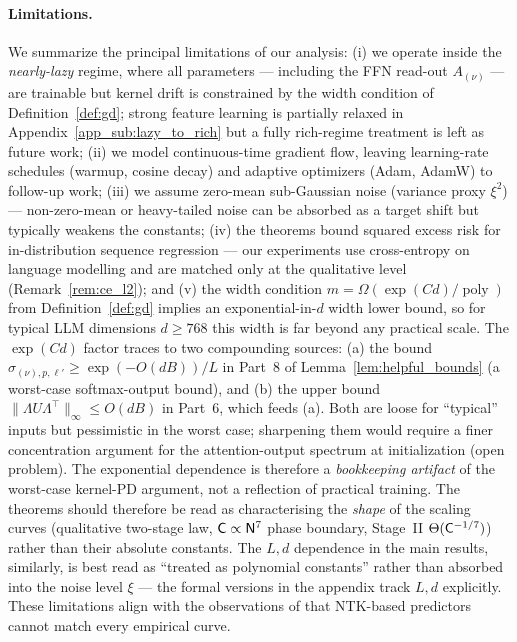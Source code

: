 \documentclass[11pt]{article}
\let\citet\citep
\theoremstyle{plain}
\DeclareMathOperator{\poly}{poly}
\begin{document}
\paragraph{Limitations.} We summarize the principal limitations of our analysis: (i) we operate inside the {\it nearly-lazy} regime, where all parameters --- including the FFN read-out $A_{(\nu)}$ --- are trainable but kernel drift is constrained by the width condition of Definition~\ref{def:gd}; strong feature learning \citep{boc+25, vbn22} is partially relaxed in Appendix~\ref{app_sub:lazy_to_rich} but a fully rich-regime treatment is left as future work; (ii) we model continuous-time gradient flow, leaving learning-rate schedules (warmup, cosine decay) and adaptive optimizers (Adam, AdamW) to follow-up work; (iii) we assume zero-mean sub-Gaussian noise (variance proxy $\xi^2$) --- non-zero-mean or heavy-tailed noise can be absorbed as a target shift but typically weakens the constants; (iv) the theorems bound squared excess risk for in-distribution sequence regression --- our experiments use cross-entropy on language modelling and are matched only at the qualitative level (Remark~\ref{rem:ce_l2}); and (v) the width condition $m=\Omega(\exp(Cd)/\poly)$ from Definition~\ref{def:gd} implies an exponential-in-$d$ width lower bound, so for typical LLM dimensions $d\ge 768$ this width is far beyond any practical scale. The $\exp(Cd)$ factor traces to two compounding sources: (a) the bound $\sigma_{(\nu),p,\ell'}\ge \exp(-O(dB))/L$ in Part~8 of Lemma~\ref{lem:helpful_bounds} (a worst-case softmax-output bound), and (b) the upper bound $\|\Lambda U \Lambda^\top\|_\infty\le O(dB)$ in Part~6, which feeds (a). Both are loose for ``typical'' inputs but pessimistic in the worst case; sharpening them would require a finer concentration argument for the attention-output spectrum at initialization (open problem). The exponential dependence is therefore a {\it bookkeeping artifact} of the worst-case kernel-PD argument, not a reflection of practical training. The theorems should therefore be read as characterising the {\it shape} of the scaling curves (qualitative two-stage law, ${\sf C}\propto{\sf N}^7$ phase boundary, Stage~II $\Theta({\sf C}^{-1/7})$) rather than their absolute constants. The $L,d$ dependence in the main results, similarly, is best read as ``treated as polynomial constants'' rather than absorbed into the noise level $\xi$ --- the formal versions in the appendix track $L,d$ explicitly. These limitations align with the observations of \citet{vbn22} that NTK-based predictors cannot match every empirical curve.
\end{document}
